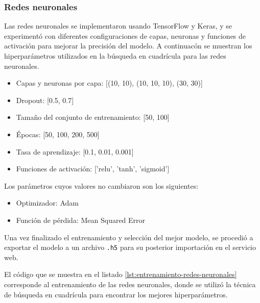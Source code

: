 \subsubsection{Redes neuronales}
Las redes neuronales se implementaron usando TensorFlow y Keras, y se experimentó
con diferentes configuraciones de capas, neuronas y funciones de activación para
mejorar la precisión del modelo. A continuacón se muestran los hiperparámetros
utilizados en la búsqueda en cuadrícula para las redes neuronales.

\begin{itemize}
    \item Capas y neuronas por capa: [(10, 10), (10, 10, 10), (30, 30)]
    \item Dropout: [0.5, 0.7]
    \item Tamaño del conjunto de entrenamiento: [50, 100]
    \item Épocas: [50, 100, 200, 500]
    \item Tasa de aprendizaje: [0.1, 0.01, 0.001]
    \item Funciones de activación: ['relu', 'tanh', 'sigmoid']
\end{itemize}

Los parámetros cuyos valores no cambiaron son los siguientes:

\begin{itemize}
    \item Optimizador: Adam
    \item Función de pérdida: Mean Squared Error
\end{itemize}

Una vez finalizado el entrenamiento y selección del mejor modelo, se procedió
a exportar el modelo a un archivo \texttt{.h5} para su posterior importación en el
servicio web.

El código que se muestra en el listado \ref{lst:entrenamiento-redes-neuronales}
corresponde al entrenamiento de las redes neuronales, donde se utilizó la técnica
de búsqueda en cuadrícula para encontrar los mejores hiperparámetros.

